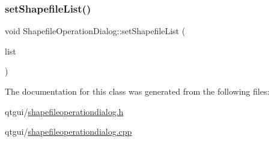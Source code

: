 \mbox{\label{class_shapefile_operation_dialog_a7c8834c2eefdb7742f31f61f5955bfb6}} 
\subsubsection{\texorpdfstring{setShapefileList()}{setShapefileList()}}
{\footnotesize\ttfamily void Shapefile\+Operation\+Dialog\+::set\+Shapefile\+List (\begin{DoxyParamCaption}\item[{Q\+String\+List}]{list }\end{DoxyParamCaption})}



The documentation for this class was generated from the following files\+:\begin{DoxyCompactItemize}
\item 
qtgui/\mbox{\hyperlink{shapefileoperationdialog_8h}{shapefileoperationdialog.\+h}}\item 
qtgui/\mbox{\hyperlink{shapefileoperationdialog_8cpp}{shapefileoperationdialog.\+cpp}}\end{DoxyCompactItemize}
